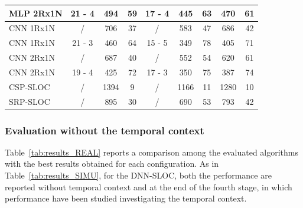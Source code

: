 \documentclass[review]{elsarticle}
\newcommand{\tableref}[1]{Table~\ref{#1}}
\begin{document}
\begin{table}[!h]
{\begin{tabular}{l|ccc|ccc|cc}
			MLP 2Rx1N & 21 - 4                      & 494                      & 59                            & 17 - 4                      & 445                      & 63                            & 470                      & 61                            \\ \hline
			CNN 1Rx1N & /                          & 706                      & 37                            & /                          & 583                      & 47                            & 686                      & 42                            \\
			CNN 1Rx1N & 21 - 3                      & 460                      & 64                            & 15 - 5                      & 349                      & 78                            & 405                     & 71                            \\ \hline
			CNN 2Rx1N & /                          & 687                      & 40                            & /                          & 552                      & 54                            & 620                     & 61                            \\
			CNN 2Rx1N & 19 - 4                      & 425                      & 72                            & 17 - 3                      & 350                      & 75                            & 387                      & 74                            \\ \hline
			CSP-SLOC  & /                          & 1394                     & 9                             & /                          & 1166                     & 11                            & 1280                     & 10                            \\ \hline
			SRP-SLOC  & /                          & 895                      & 30                            & /                          & 690                      & 53                            & 793                      & 42                                                  
			
		\end{tabular}
	}
\end{table}


\subsubsection{Evaluation without the temporal context}
\tableref{tab:results_REAL} reports a comparison among the evaluated algorithms with the best results obtained for each configuration. As in \tableref{tab:results_SIMU}, for the DNN-SLOC, both the performance are reported without temporal context and at the end of the fourth stage, in which performance have been studied investigating the temporal context.
\end{document}
